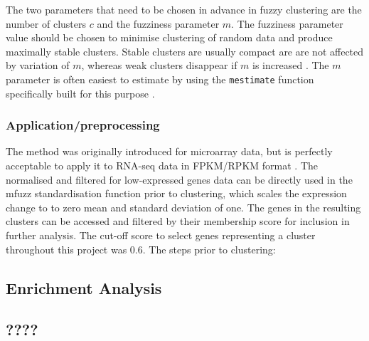  
 
The two parameters that need to be chosen in advance in fuzzy clustering are the number of clusters $c$ and the fuzziness parameter $m$. The fuzziness parameter value should be chosen to minimise clustering of random data and produce maximally stable clusters. Stable clusters are usually compact are are not affected by variation of $m$, whereas weak clusters disappear if $m$ is increased \cite{Kumar2007Mfuzz:Data}. The $m$ parameter is often easiest to estimate by using the \texttt{mestimate} function specifically built for this purpose \cite{Schwammle2010AAnalysis}. 
 
 
 
 
 
 
 
\subsubsection{Application/preprocessing}
 
The method was originally introduced for microarray data, but is perfectly acceptable to apply it to RNA-seq data in FPKM/RPKM format \cite{Futschik2007MfuzzHomepage}.  The normalised and filtered for low-expressed genes data can be directly used in the mfuzz standardisation function prior to clustering, which scales the expression change to to zero mean and standard deviation of one.
The genes in the resulting clusters can be accessed and filtered by their membership score for inclusion in further analysis. The cut-off score to select genes representing a cluster throughout this project was 0.6. 
The steps prior to clustering:
 
 
 


    
    \subsection{Enrichment Analysis}
    
    \subsection{????}
    
    
